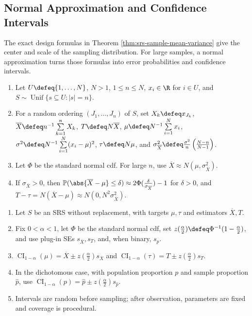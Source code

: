 \subsection{Normal Approximation and Confidence Intervals}

The exact design formulas in Theorem \ref{thm:srs-sample-mean-variance} give the center and scale of the sampling distribution.  For large samples, a normal approximation turns those formulas into error probabilities and confidence intervals.

\begin{method} \label{meth:srs-normal-approximation} 
\begin{enumerate}[label=(\roman*)]
\setlength{\itemsep}{0pt}
\item Let $U\defeq\{1,\ldots,N\}$, $N>1$, $1\leq n\leq N$, $x_i\in\R$ for $i\in U$, and $S\sim\operatorname{Unif}\{s\subseteq U:|s|=n\}$.
\item For a random ordering $(J_1,\ldots,J_n)$ of $S$, set $X_k\defeq x_{J_k}$, $\overline{X}\defeq n^{-1}\sum\limits_{k=1}^{n}X_k$, $T\defeq N\overline{X}$, $\mu\defeq N^{-1}\sum\limits_{i=1}^{N}x_i$, $\sigma^2\defeq N^{-1}\sum\limits_{i=1}^{N}(x_i-\mu)^2$, $\tau\defeq N\mu$, and $\sigma_{\overline{X}}^2\defeq\frac{\sigma^2}{n}\left(\frac{N-n}{N-1}\right)$.
\item Let $\Phi$ be the standard normal cdf. For large $n$, use $\overline{X}\approx N(\mu,\sigma_{\overline{X}}^2)$.
\item If $\sigma_{\overline{X}}>0$, then $\mathbb{P}(\abs{\overline{X}-\mu}\leq\delta)\approx2\Phi(\frac{\delta}{\sigma_{\overline{X}}})-1$ for $\delta>0$, and $T-\tau=N(\overline{X}-\mu)\approx N(0,N^2\sigma_{\overline{X}}^2)$.
\end{enumerate}
\end{method}

\begin{method} \label{meth:srs-normal-confidence-intervals} 
\begin{enumerate}[label=(\roman*)]
\setlength{\itemsep}{0pt}
\item Let $S$ be an SRS without replacement, with targets $\mu,\tau$ and estimators $\overline{X},T$.
\item Fix $0<\alpha<1$, let $\Phi$ be the standard normal cdf, set $z(\frac{\alpha}{2})\defeq\Phi^{-1}(1-\frac{\alpha}{2})$, and use plug-in SEs $s_{\overline{X}},s_T$, and, when binary, $s_{\widehat p}$.
\item $\operatorname{CI}_{1-\alpha}(\mu)=\overline{X}\pm z(\frac{\alpha}{2})s_{\overline{X}}$ and $\operatorname{CI}_{1-\alpha}(\tau)=T\pm z(\frac{\alpha}{2})s_T$.
\item In the dichotomous case, with population proportion $p$ and sample proportion $\widehat p$, use $\operatorname{CI}_{1-\alpha}(p)=\widehat p\pm z(\frac{\alpha}{2})s_{\widehat p}$.
\item Intervals are random before sampling; after observation, parameters are fixed and coverage is procedural.
\end{enumerate}
\end{method}

